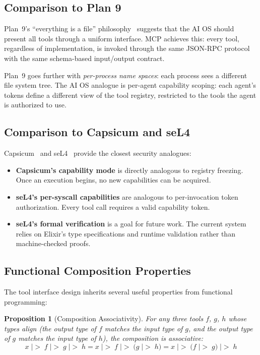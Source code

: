 \documentclass[12pt,a4paper]{article}
\theoremstyle{plain}
\newtheorem{proposition}[theorem]{Proposition}
\theoremstyle{definition}
\newcommand{\pipe}{\;|\!\!>\;}
\begin{document}
\subsection{Comparison to Plan 9}

Plan~9's ``everything is a file'' philosophy~\citep{pike1995plan9} suggests that the AI OS should present all tools through a uniform interface. MCP achieves this: every tool, regardless of implementation, is invoked through the same JSON-RPC protocol with the same schema-based input/output contract.

Plan~9 goes further with \emph{per-process name spaces}: each process sees a different file system tree. The AI OS analogue is per-agent capability scoping: each agent's tokens define a different view of the tool registry, restricted to the tools the agent is authorized to use.

\subsection{Comparison to Capsicum and seL4}

Capsicum~\citep{watson2010capsicum} and seL4~\citep{klein2009sel4} provide the closest security analogues:

\begin{itemize}[leftmargin=2em]
\item \textbf{Capsicum's capability mode} is directly analogous to registry freezing. Once an execution begins, no new capabilities can be acquired.
\item \textbf{seL4's per-syscall capabilities} are analogous to per-invocation token authorization. Every tool call requires a valid capability token.
\item \textbf{seL4's formal verification} is a goal for future work. The current system relies on Elixir's type specifications and runtime validation rather than machine-checked proofs.
\end{itemize}

\subsection{Functional Composition Properties}

The tool interface design inherits several useful properties from functional programming:

\begin{proposition}[Composition Associativity]
For any three tools $f$, $g$, $h$ whose types align (the output type of $f$ matches the input type of $g$, and the output type of $g$ matches the input type of $h$), the composition is associative:
\[
  x \pipe f \pipe g \pipe h = x \pipe f \pipe (g \pipe h) = x \pipe (f \pipe g) \pipe h
\]
\end{proposition}
\end{document}
